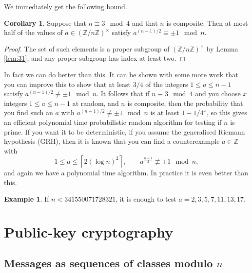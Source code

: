 \documentclass{article}
\newcommand{\Z}{\mathbb{Z}}
\newcommand{\rb}[1]{\left( #1 \right)}
\newcommand{\unit}[1]{\rb{\Z / #1\Z}^\times}
\theoremstyle{definition}\newtheorem{definition}{Definition}
\theoremstyle{definition}\newtheorem{remark}[definition]{Remark}
\theoremstyle{definition}\newtheorem*{example}{Example}
\theoremstyle{definition}\newtheorem*{note}{Note}
\newtheorem{corollary}[definition]{Corollary}
\begin{document}
We immediately get the following bound.

\begin{corollary}
Suppose that $ n \equiv 3 \mod 4 $ and that $ n $ is composite. Then at most half of the values of $ a \in \unit{n} $ satisfy $ a^{\rb{n - 1} / 2} \equiv \pm 1 \mod n $.
\end{corollary}

\begin{proof}
The set of such elements is a proper subgroup of $ \unit{n} $ by Lemma \ref{lem:31}, and any proper subgroup has index at least two.
\end{proof}

In fact we can do better than this. It can be shown with some more work that you can improve this to show that at least $ 3 / 4 $ of the integers $ 1 \le a \le n - 1 $ satisfy $ a^{\rb{n - 1} / 2} \not\equiv \pm 1 \mod n $. It follows that if $ n \equiv 3 \mod 4 $ and you choose $ x $ integers $ 1 \le a \le n - 1 $ at random, and $ n $ is composite, then the probability that you find such an $ a $ with $ a^{\rb{n - 1} / 2} \not\equiv \pm 1 \mod n $ is at least $ 1 - 1 / 4^x $, so this gives an efficient polynomial time probabilistic random algorithm for testing if $ n $ is prime. If you want it to be deterministic, if you assume the generalised Riemann hypothesis (GRH), then it is known that you can find a counterexample $ a \in \Z $ with
$$ 1 \le a \le \left\lceil 2 \rb{\log n}^2 \right\rceil, \qquad a^{\tfrac{n - 1}{2}} \not\equiv \pm 1 \mod n, $$
and again we have a polynomial time algorithm. In practice it is even better than this.

\begin{example}
If $ n < 341550071728321 $, it is enough to test $ a = 2, 3, 5, 7, 11, 13, 17 $.
\end{example}

\section{Public-key cryptography}

\subsection{Messages as sequences of classes modulo $ n $}
\end{document}
